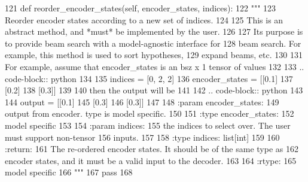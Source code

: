 \begin{DoxyCode}
121     \textcolor{keyword}{def }reorder\_encoder\_states(self, encoder\_states, indices):
122         \textcolor{stringliteral}{"""}
123 \textcolor{stringliteral}{        Reorder encoder states according to a new set of indices.}
124 \textcolor{stringliteral}{}
125 \textcolor{stringliteral}{        This is an abstract method, and *must* be implemented by the user.}
126 \textcolor{stringliteral}{}
127 \textcolor{stringliteral}{        Its purpose is to provide beam search with a model-agnostic interface for}
128 \textcolor{stringliteral}{        beam search. For example, this method is used to sort hypotheses,}
129 \textcolor{stringliteral}{        expand beams, etc.}
130 \textcolor{stringliteral}{}
131 \textcolor{stringliteral}{        For example, assume that encoder\_states is an bsz x 1 tensor of values}
132 \textcolor{stringliteral}{}
133 \textcolor{stringliteral}{        .. code-block:: python}
134 \textcolor{stringliteral}{}
135 \textcolor{stringliteral}{            indices = [0, 2, 2]}
136 \textcolor{stringliteral}{            encoder\_states = [[0.1]}
137 \textcolor{stringliteral}{                              [0.2]}
138 \textcolor{stringliteral}{                              [0.3]]}
139 \textcolor{stringliteral}{}
140 \textcolor{stringliteral}{        then the output will be}
141 \textcolor{stringliteral}{}
142 \textcolor{stringliteral}{        .. code-block:: python}
143 \textcolor{stringliteral}{}
144 \textcolor{stringliteral}{            output = [[0.1]}
145 \textcolor{stringliteral}{                      [0.3]}
146 \textcolor{stringliteral}{                      [0.3]]}
147 \textcolor{stringliteral}{}
148 \textcolor{stringliteral}{        :param encoder\_states:}
149 \textcolor{stringliteral}{            output from encoder. type is model specific.}
150 \textcolor{stringliteral}{}
151 \textcolor{stringliteral}{        :type encoder\_states:}
152 \textcolor{stringliteral}{            model specific}
153 \textcolor{stringliteral}{}
154 \textcolor{stringliteral}{        :param indices:}
155 \textcolor{stringliteral}{            the indices to select over. The user must support non-tensor}
156 \textcolor{stringliteral}{            inputs.}
157 \textcolor{stringliteral}{}
158 \textcolor{stringliteral}{        :type indices: list[int]}
159 \textcolor{stringliteral}{}
160 \textcolor{stringliteral}{        :return:}
161 \textcolor{stringliteral}{            The re-ordered encoder states. It should be of the same type as}
162 \textcolor{stringliteral}{            encoder states, and it must be a valid input to the decoder.}
163 \textcolor{stringliteral}{}
164 \textcolor{stringliteral}{        :rtype:}
165 \textcolor{stringliteral}{            model specific}
166 \textcolor{stringliteral}{        """}
167         \textcolor{keywordflow}{pass}
168 
\end{DoxyCode}


